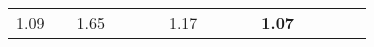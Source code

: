 \begin{tabular}{ll|rrrrrr|rrrrrrr}


  


  
  1.09 &  & 1.65 &  &  &  & 1.17 &  &  &  & \textbf{1.07} \\


\end{tabular}
